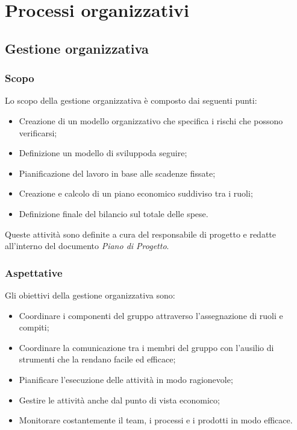 %
\section{Processi organizzativi}
	\subsection{Gestione organizzativa}
		\subsubsection{Scopo}
			Lo scopo della gestione organizzativa è composto dai seguenti punti:
			\begin{itemize}
				\item Creazione di un modello organizzativo che specifica i rischi che possono verificarsi;
				\item Definizione un modello di sviluppo\glosp da seguire;
				\item Pianificazione del lavoro in base alle scadenze fissate;
				\item Creazione e calcolo di un piano economico suddiviso tra i ruoli;
				\item Definizione finale del bilancio sul totale delle spese.
			\end{itemize}
			Queste attività sono definite a cura del responsabile di progetto e redatte all'interno del documento \textit{Piano di Progetto}.
		\subsubsection{Aspettative}
			Gli obiettivi della gestione organizzativa sono:
			\begin{itemize}
				\item Coordinare i componenti del gruppo attraverso l'assegnazione di ruoli e compiti;
				\item Coordinare la comunicazione tra i membri del gruppo con l'ausilio di strumenti che la rendano facile ed efficace;
				\item Pianificare l'esecuzione delle attività in modo ragionevole;
				\item Gestire le attività anche dal punto di vista economico;
				\item Monitorare costantemente il team, i processi e i prodotti in modo efficace.
			\end{itemize}
